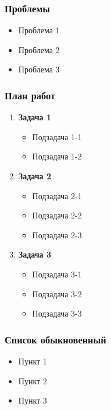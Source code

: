 \begin{frame}
\frametitle{Проблемы}
\begin{itemize}
  \item Проблема 1
  \item Проблема 2
  \item Проблема 3
\end{itemize}
\end{frame}

\begin{frame}
\frametitle{План работ}
\begin{enumerate}
  \item \textbf{Задача 1}
  \begin{itemize}
    \item Подзадача 1-1
    \item Подзадача 1-2
  \end{itemize}
  \item \textbf{Задача 2}
  \begin{itemize}
    \item Подзадача 2-1
    \item Подзадача 2-2
    \item Подзадача 2-3
  \end{itemize}
  \item \textbf{Задача 3}
  \begin{itemize}
    \item Подзадача 3-1
    \item Подзадача 3-2
    \item Подзадача 3-3
  \end{itemize}
\end{enumerate}
\end{frame}


\begin{frame}
\frametitle{Список обыкновенный}
\begin{itemize}
  \item Пункт 1
  \item Пункт 2
  \item Пункт 3
\end{itemize}
\end{frame}

